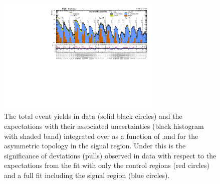 \begin{figure}[!htb]
  \begin{center}
    \includegraphics[angle=90,width=0.7\textwidth]{figs/analysis/results/summaryPlot_Asymmetric_prefit_overlay_fit_b}
    \caption{The total event yields in data (solid black circles)
      and the \SM expectations with their associated uncertainties (black
      histogram with shaded band) integrated over \MHT as a function of
      \nj,\nb and \HT for the asymmetric topology in the
      signal region. Under this is the significance of deviations
      (pulls) observed in data with respect to the \SM expectations
      from the fit with only the control regions (red circles) and a
      full fit including the signal region (blue circles).}
    \label{fig:asym}
  \end{center}
\end{figure}

